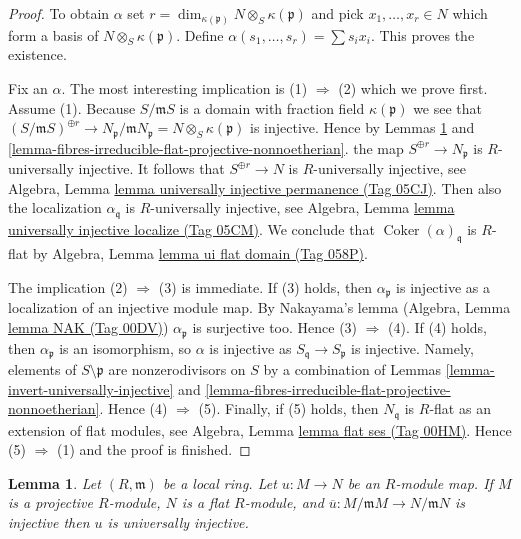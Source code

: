 \documentclass{amsart}
\theoremstyle{plain}
\newtheorem{lemma}[subsection]{Lemma}
\theoremstyle{definition}
\theoremstyle{remark}
\numberwithin{equation}{subsection}
\def\Coker{\mathop{\mathrm{Coker}}}
\begin{document}
\begin{proof}
To obtain $\alpha$ set
$r = \dim_{\kappa(\mathfrak p)} N \otimes_S \kappa(\mathfrak p)$ and pick
$x_1, \ldots, x_r \in N$ which form a basis of
$N \otimes_S \kappa(\mathfrak p)$. Define
$\alpha(s_1, \ldots, s_r) = \sum s_i x_i$. This proves the existence.

\medskip\noindent
Fix an $\alpha$. The most interesting implication is
(1) $\Rightarrow$ (2) which we prove first. Assume (1).
Because $S/\mathfrak mS$ is a domain with fraction field $\kappa(\mathfrak p)$
we see that
$(S/\mathfrak mS)^{\oplus r} \to
N_{\mathfrak p}/\mathfrak mN_{\mathfrak p} = N \otimes_S \kappa(\mathfrak p)$
is injective. Hence by
Lemmas \ref{lemma-universally-injective-local} and
\ref{lemma-fibres-irreducible-flat-projective-nonnoetherian}.
the map $S^{\oplus r} \to N_{\mathfrak p}$ is $R$-universally injective.
It follows that $S^{\oplus r} \to N$ is $R$-universally injective, see
Algebra, Lemma \href{https://stacks.math.columbia.edu/tag/05CJ}{lemma universally injective permanence (Tag 05CJ)}.
Then also the localization $\alpha_{\mathfrak q}$ is $R$-universally
injective, see
Algebra, Lemma \href{https://stacks.math.columbia.edu/tag/05CM}{lemma universally injective localize (Tag 05CM)}.
We conclude that $\Coker(\alpha)_{\mathfrak q}$ is $R$-flat by
Algebra, Lemma \href{https://stacks.math.columbia.edu/tag/058P}{lemma ui flat domain (Tag 058P)}.

\medskip\noindent
The implication (2) $\Rightarrow$ (3) is immediate. If (3) holds, then
$\alpha_{\mathfrak p}$ is injective as a localization of an injective
module map. By Nakayama's lemma
(Algebra, Lemma \href{https://stacks.math.columbia.edu/tag/00DV}{lemma NAK (Tag 00DV)})
$\alpha_{\mathfrak p}$ is surjective too. Hence (3) $\Rightarrow$ (4).
If (4) holds, then $\alpha_{\mathfrak p}$ is an isomorphism, so
$\alpha$ is injective as $S_{\mathfrak q} \to S_{\mathfrak p}$ is injective.
Namely, elements of $S \setminus \mathfrak p$ are nonzerodivisors on $S$
by a combination of
Lemmas \ref{lemma-invert-universally-injective} and
\ref{lemma-fibres-irreducible-flat-projective-nonnoetherian}.
Hence (4) $\Rightarrow$ (5). Finally, if (5) holds, then
$N_{\mathfrak q}$ is $R$-flat as an extension of flat modules, see
Algebra, Lemma \href{https://stacks.math.columbia.edu/tag/00HM}{lemma flat ses (Tag 00HM)}.
Hence (5) $\Rightarrow$ (1) and the proof is finished.
\end{proof}


\begin{lemma}
\label{lemma-universally-injective-local}
Let $(R, \mathfrak m)$ be a local ring. Let $u : M \to N$ be an $R$-module map.
If $M$ is a projective $R$-module, $N$ is a flat $R$-module, and
$\overline{u} : M/\mathfrak mM \to N/\mathfrak mN$ is injective
then $u$ is universally injective.
\end{lemma}
\end{document}
